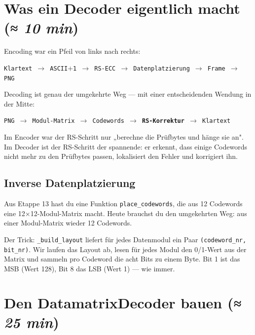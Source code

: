 \section{Was ein Decoder eigentlich macht \normalfont(\textit{≈ 10 min})}

Encoding war ein Pfeil von links nach rechts:
\begin{center}
\texttt{Klartext $\to$ ASCII$+$1 $\to$ RS-ECC $\to$ Datenplatzierung $\to$ Frame $\to$ PNG}
\end{center}

Decoding ist genau der umgekehrte Weg — mit einer entscheidenden
Wendung in der Mitte:
\begin{center}
\texttt{PNG $\to$ Modul-Matrix $\to$ Codewords $\to$ \textbf{RS-Korrektur} $\to$ Klartext}
\end{center}

Im Encoder war der RS-Schritt nur „berechne die Prüfbytes und hänge
sie an". Im Decoder ist der RS-Schritt der spannende: er erkennt,
dass einige Codewords nicht mehr zu den Prüfbytes passen, lokalisiert
den Fehler und korrigiert ihn.

\subsection*{Inverse Datenplatzierung}

Aus Etappe 13 hast du eine Funktion \texttt{place\_codewords}, die
aus 12 Codewords eine 12$\times$12-Modul-Matrix macht. Heute brauchst
du den umgekehrten Weg: aus einer Modul-Matrix wieder 12 Codewords.

Der Trick: \texttt{\_build\_layout} liefert für jedes Datenmodul ein
Paar \texttt{(codeword\_nr, bit\_nr)}. Wir laufen das Layout ab, lesen
für jedes Modul den 0/1-Wert aus der Matrix und sammeln pro Codeword
die acht Bits zu einem Byte. Bit 1 ist das MSB (Wert 128), Bit 8 das
LSB (Wert 1) — wie immer.

\section{Den DatamatrixDecoder bauen \normalfont(\textit{≈ 25 min})}

